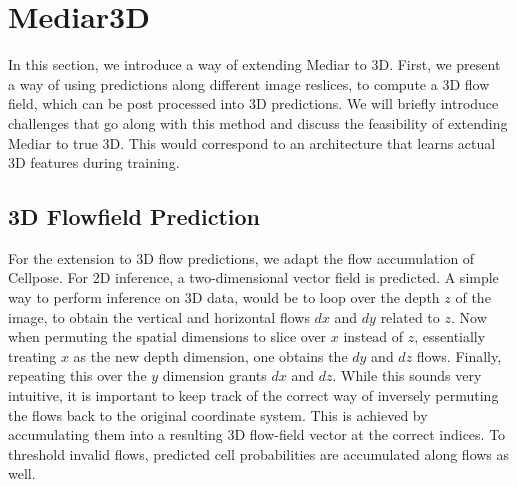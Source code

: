 \section{Mediar3D}

In this section, we introduce a way of extending Mediar to 3D. First, we present a way of using predictions along different image reslices, to compute a 3D flow field, which can be post processed into 3D predictions. We will briefly introduce challenges that go along with this method and discuss the feasibility of extending Mediar to true 3D. This would correspond to an architecture that learns actual 3D features during training.

\subsection{3D Flowfield Prediction}

For the extension to 3D flow predictions, we adapt the flow accumulation of Cellpose. For 2D inference, a two-dimensional vector field is predicted. A simple way to perform inference on 3D data, would be to loop over the depth $z$ of the image, to obtain the vertical and horizontal flows $dx$ and $dy$ related to $z$. Now when permuting the spatial dimensions to slice over $x$ instead of $z$, essentially treating $x$ as the new depth dimension, one obtains the $dy$ and $dz$ flows. Finally, repeating this over the $y$ dimension grants $dx$ and $dz$. While this sounds very intuitive, it is important to keep track of the correct way of inversely permuting the flows back to the original coordinate system. This is achieved by accumulating them into a resulting 3D flow-field vector at the correct indices. To threshold invalid flows, predicted cell probabilities are accumulated along flows as well.

